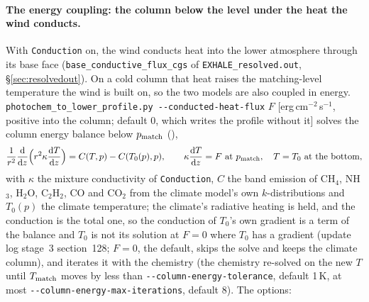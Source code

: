\documentclass[english,a4paper]{my_memo}
\begin{document}
\paragraph{The energy coupling: the column below the level under the heat the
wind conducts.} With \texttt{Conduction} on, the wind conducts heat into the
lower atmosphere through its base face (\texttt{base\_conductive\_flux\_cgs}
of \texttt{EXHALE\_resolved.out}, \S\ref{sec:resolvedout}). On a cold column
that heat raises the matching-level temperature the wind is built on, so the
two models are also coupled in energy. \texttt{photochem\_to\_lower\_profile.py
-{}-conducted-heat-flux} $F$ [erg\,cm$^{-2}$\,s$^{-1}$, positive into the
column; default 0, which writes the profile without it] solves the column
energy balance below $p_{\rm match}$
(),
\begin{equation*}
\frac{1}{r^2}\frac{\rm d}{{\rm d}z}\Big(r^2\kappa\frac{{\rm d}T}{{\rm d}z}\Big)
= C(T,p)-C(T_0(p),p),\qquad
\kappa\frac{{\rm d}T}{{\rm d}z}=F\ \text{at}\ p_{\rm match},\quad T=T_0\ \text{at the bottom},
\end{equation*}
with $\kappa$ the mixture conductivity of \texttt{Conduction}, $C$ the band
emission of CH$_4$, NH$_3$, H$_2$O, C$_2$H$_2$, CO and CO$_2$ from the climate
model's own $k$-distributions and $T_0(p)$ the climate temperature; the
climate's radiative heating is held, and the conduction is the total one, so
the conduction of $T_0$'s own gradient is a term of the balance and $T_0$ is
not its solution at $F=0$ where $T_0$ has a gradient (update log stage~3
section~128; $F=0$, the default, skips the solve and keeps the climate
column), and iterates it with the chemistry
(the chemistry re-solved on the new $T$ until $T_{\rm match}$ moves by less than
\texttt{-{}-column-energy-tolerance}, default 1\,K, at most
\texttt{-{}-column-energy-max-iterations}, default 8). The options:
\end{document}
